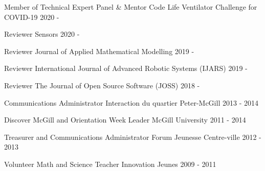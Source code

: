 \begin{cvhonors}

\cvhonor
{Member of Technical Expert Panel \& Mentor}
{Code Life Ventilator Challenge for COVID-19}
{}
{2020 - }

\cvhonor
{Reviewer}
{Sensors}
{}
{2020 - }

\cvhonor
{Reviewer}
{Journal of Applied Mathematical Modelling}
{}
{2019 - }

\cvhonor
{Reviewer}
{International Journal of Advanced Robotic Systems (IJARS)}
{}
{2019 - }

\cvhonor
{Reviewer}
{The Journal of Open Source Software (JOSS)}
{}
{2018 - }

\cvhonor
{Communications Administrator}
{Interaction du quartier Peter-McGill}
{}
{2013 - 2014}

\cvhonor
{Discover McGill and Orientation Week Leader}
{McGill University}
{}
{2011 - 2014}

\cvhonor
{Treasurer and Communications Administrator}
{Forum Jeunesse Centre-ville}
{}
{2012 - 2013}

\cvhonor
{Volunteer Math and Science Teacher}
{Innovation Jeunes}
{}
{2009 - 2011}

\end{cvhonors}
